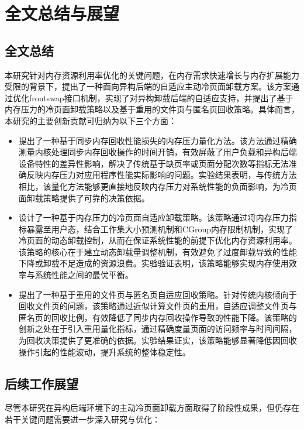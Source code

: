 \chapter{全文总结与展望}

\section{全文总结}
本研究针对内存资源利用率优化的关键问题，在内存需求快速增长与内存扩展能力受限的背景下，提出了一种面向异构后端的自适应主动冷页面卸载方案。该方案通过优化frontswap接口机制，实现了对异构卸载后端的自适应支持，并提出了基于内存压力的冷页面卸载策略以及基于重用的文件页与匿名页回收策略。具体而言，本研究的主要创新贡献可归纳为以下三个方面：

\begin{itemize}
    \item 提出了一种基于同步内存回收性能损失的内存压力量化方法。该方法通过精确测量内核处理同步内存回收操作的时间开销，有效屏蔽了用户负载和异构后端设备特性的差异性影响，解决了传统基于缺页率或页面分配次数等指标无法准确反映内存压力对应用程序性能实际影响的问题。实验结果表明，与传统方法相比，该量化方法能够更直接地反映内存压力对系统性能的负面影响，为冷页面卸载策略提供了可靠的决策依据。

    \item 设计了一种基于内存压力的冷页面自适应卸载策略。该策略通过将内存压力指标暴露至用户态，结合工作集大小预测机制和CGroup内存限制机制，实现了冷页面的动态卸载控制，从而在保证系统性能的前提下优化内存资源利用率。该策略的核心在于建立动态卸载量调整机制，有效避免了过度卸载导致的性能下降或卸载不足造成的资源浪费。实验验证表明，该策略能够实现内存使用效率与系统性能之间的最优平衡。

    \item 提出了一种基于重用的文件页与匿名页自适应回收策略。针对传统内核倾向于回收文件页的问题，该策略通过近似计算文件页的重用，自适应调整文件页与匿名页的回收比例，有效降低了同步内存回收操作导致的性能下降。该策略的创新之处在于引入重用量化指标，通过精确度量页面的访问频率与时间间隔，为回收决策提供了更准确的依据。实验结果证实，该策略能够显著降低因回收操作引起的性能波动，提升系统的整体稳定性。

\end{itemize}

\section{后续工作展望}
尽管本研究在异构后端环境下的主动冷页面卸载方面取得了阶段性成果，但仍存在若干关键问题需要进一步深入研究与优化：

